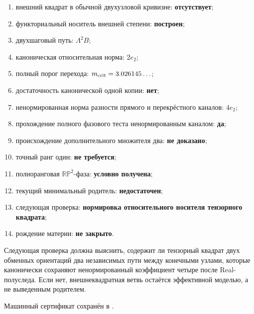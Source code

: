 \begin{protocol}
\begin{enumerate}
 \item внешний квадрат в обычной двухузловой кривизне:
 \textbf{отсутствует};
 \item функториальный носитель внешней степени: \textbf{построен};
 \item двухшаговый путь: \textbf{$\Lambda^2B$};
 \item каноническая относительная норма: \textbf{$2e_2$};
 \item полный порог перехода: \textbf{$m_{\rm crit}=3.026145\ldots$};
 \item достаточность канонической одной копии: \textbf{нет};
 \item ненормированная норма разности прямого и перекрёстного каналов: \textbf{$4e_2$};
 \item прохождение полного фазового теста ненормированным каналом: \textbf{да};
 \item происхождение дополнительного множителя два:
 \textbf{не доказано};
 \item точный ранг один: \textbf{не требуется};
 \item полноранговая $\mathbb{RP}^2$-фаза: \textbf{условно получена};
 \item текущий минимальный родитель: \textbf{недостаточен};
 \item следующая проверка:
 \textbf{нормировка относительного носителя тензорного квадрата};
 \item рождение материи: \textbf{не закрыто}.
\end{enumerate}
\end{protocol}

Следующая проверка должна выяснить, содержит ли тензорный квадрат двух
обменных ориентаций два независимых пути между конечными узлами, которые канонически
сохраняют ненормированный коэффициент четыре после Real-полуследа. Если нет,
внешнеквадратная ветвь остаётся эффективной моделью, а не выведенным
родителем.

Машинный сертификат сохранён в
.